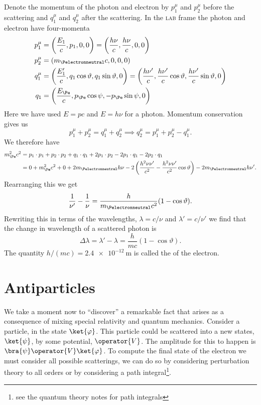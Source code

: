 \documentclass[fleqn]{NotesClass}
\newcommand{\LAB}{\textsc{lab}}
\begin{document}
    Denote the momentum of the photon and electron by \(p_1^\mu\) and \(p_2^\mu\) before the scattering and \(q_1^\mu\) and \(q_2^\mu\) after the scattering.
    In the \LAB{} frame the photon and electron have four-momenta
    \begin{align}
        p_1^\mu &= \left( \frac{E_1}{c}, p_1, 0, 0 \right) = \left( \frac{h\nu}{c}, \frac{h\nu}{c}, 0, 0 \right)\\
        p_2^\mu &= \left( m_{\Pelectronneutral}c, 0, 0, 0 \right)\\
        q_1^\mu &= \left( \frac{E_1'}{c}, q_1\cos\vartheta, q_1\sin\vartheta, 0 \right) = \left( \frac{h\nu'}{c}, \frac{h\nu'}{c}\cos\vartheta, \frac{h\nu'}{c}\sin\vartheta, 0 \right)\\
        q_1 &= \left( \frac{E_{\Pe}}{c}, p_{\Pe}\cos\psi, -p_{\Pe}\sin\psi, 0 \right)
    \end{align}
    Here we have used \(E = pc\) and \(E = h\nu\) for a photon.
    Momentum conservation gives us
    \begin{equation}
        p_1^\mu + p_2^\mu = q_1^\mu + q_2^\mu \implies q_2^\mu = p_1^\mu + p_2^\mu - q_1^\mu.
    \end{equation}
    We therefore have
    \begin{align}
        m_{\Pe}^2c^2 &= p_1\cdot p_1 + p_2\cdot p_2 + q_1\cdot q_1 + 2p_1\cdot p_2 - 2p_1\cdot q_1 - 2p_2\cdot q_1\\
        &= 0 + m_{\Pe}^2c^2 + 0 + 2m_{\Pelectronneutral}h\nu - 2\left( \frac{h^2\nu\nu'}{c^2} - \frac{h^2\nu\nu'}{c^2}\cos\vartheta \right) - 2m_{\Pelectronneutral}h\nu'.
    \end{align}
    Rearranging this we get
    \begin{equation}
        \frac{1}{\nu'} - \frac{1}{\nu} = \frac{h}{m_{\Pelectronneutral}c^2}(1 - \cos\vartheta).
    \end{equation}
    Rewriting this in terms of the wavelengths, \(\lambda = c/\nu\) and \(\lambda' = c/\nu'\) we find that the change in wavelength of a scattered photon is
    \begin{equation}
        \Delta\lambda = \lambda' - \lambda = \frac{h}{mc}(1 - \cos\vartheta).
    \end{equation}
    The quantity \(h/(mc) = \qty{2.4e-12}{\metre}\) is called the  of the electron.
    
    \section{Antiparticles}
    We take a moment now to \enquote{discover} a remarkable fact that arises as a consequence of mixing special relativity and quantum mechanics.
    Consider a particle, in the state \(\ket{\varphi}\).
    This particle could be scattered into a new states, \(\ket{\psi}\), by some potential, \(\operator{V}\).
    The amplitude for this to happen is \(\bra{\psi}\operator{V}\ket{\varphi}\).
    To compute the final state of the electron we must consider all possible scatterings, we can do so by considering perturbation theory to all orders or by considering a path integral\footnote{see the quantum theory notes for path integrals}.
    
\end{document}
